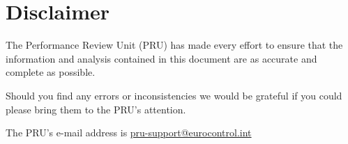 \documentclass[
  11pt,
  a4paperpaper,
  openany,headsepline=on,footsepline=off,DIV=12,table]{scrbook}
\begin{document}

\chapter*{Disclaimer}\label{disclaimer}


The Performance Review Unit (PRU) has made every effort to ensure that
the information and analysis contained in this document are as accurate
and complete as possible.

Should you find any errors or inconsistencies we would be grateful if
you could please bring them to the PRU's attention.

The PRU's e-mail address is
\href{mailto:PRU-Support@eurocontrol.int?subject=Feedback:\%20ACE\%20Handbook}{pru-support@eurocontrol.int}


\backmatter
\end{document}
